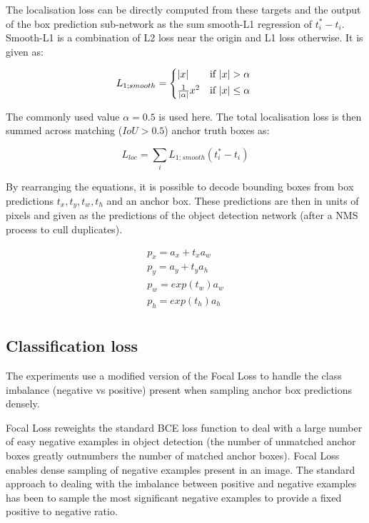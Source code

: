 The localisation loss can be directly computed from these targets and the output of the box prediction sub-network as the sum smooth-L1 regression of $t_i^* - t_i$. Smooth-L1 is a combination of L2 loss near the origin and L1 loss otherwise. It is given as:

\begin{equation}
L_{1;smooth} = 
\begin{cases*}
|x| & if $|x|>\alpha $ \\
\frac{1}{|\alpha|}x^2 & if $|x| \leq \alpha$
\end{cases*}
\label{eq:smooth_l1}
\end{equation}

The commonly used value $\alpha = 0.5$ is used here. The total localisation loss is then summed across matching ($IoU > 0.5$) anchor truth boxes as:

\begin{equation}
L_{loc} = \sum_i{L_{1;smooth}(t_i^* - t_i)}
\label{eq:loss_loc}
\end{equation}

By rearranging the equations,  it is possible to decode bounding boxes from box predictions $t_x, t_y, t_w, t_h$  and an anchor box. These predictions are then in units of pixels and given as the predictions of the object detection network (after a \gls{NMS} process to cull duplicates).

\begin{equation}
\begin{split}
p_x = a_x + t_x  a_w\\
p_y = a_y + t_y  a_h\\
p_w = exp(t_w) a_w \\
p_h = exp(t_h) a_h\\
\end{split}
\label{eq:decoding_rcnn}
\end{equation}

\subsection {Classification loss}
\label{sec:loss}

The experiments use a modified version of the Focal Loss \cite{Lin2017} to handle the class imbalance (negative vs positive) present when sampling anchor box predictions densely.

Focal Loss \cite{Lin2017} reweights the standard \gls{BCE} loss function to deal with a large number of easy negative examples in object detection (the number of unmatched anchor boxes greatly outnumbers the number of matched anchor boxes). Focal Loss enables dense sampling of negative examples present in an image. The standard approach to dealing with the imbalance between positive and negative examples has been to sample the most significant negative examples to provide a fixed positive to negative ratio.

